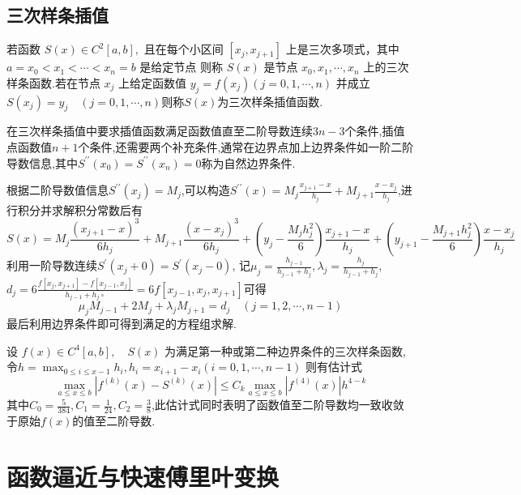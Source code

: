 \documentclass[10pt]{yerbaformat}
\begin{document}
\subsection{三次样条插值}
\begin{definition}
    若函数 $S(x) \in C^{2}[a, b],$ 且在每个小区间 $\left[x_{j}, x_{j+1}\right]$
    上是三次多项式，其中 $a=x_{0}<x_{1}<\cdots<x_{n}=b$ 是给定节点
    则称 $S(x)$ 是节点 $x_{0}, x_{1}, \cdots, x_{n}$ 上的三次样条函数.若在节点 $x_{j}$ 上给定函数值 $y_{j}=f\left(x_{j}\right)(j=0,1, \cdots, n)$
    并成立$S\left(x_{j}\right)=y_{j} \quad(j=0,1, \cdots, n)$则称$S(x)$为三次样条插值函数.
\end{definition}

\par 在三次样条插值中要求插值函数满足函数值直至二阶导数连续$3n-3$个条件,插值点函数值$n+1$个条件,还需要两个补充条件,通常在边界点加上边界条件如一阶二阶导数信息,其中$S^{\prime \prime}\left(x_{0}\right)=S^{\prime \prime}\left(x_{n}\right)=0$称为自然边界条件.

\par 根据二阶导数值信息$S^{\prime \prime}\left(x_{j}\right)=M_{j}$,可以构造$S^{\prime \prime}(x)=M_{j} \frac{x_{j+1}-x}{h_{j}}+M_{j+1} \frac{x-x_{j}}{h_{j}}$,进行积分并求解积分常数后有$$S(x) =M_{j} \frac{\left(x_{j+1}-x\right)^{3}}{6 h_{j}}+M_{j+1} \frac{\left(x-x_{j}\right)^{3}}{6 h_{j}}
    +\left(y_{j}-\frac{M_{j} h_{j}^{2}}{6}\right) \frac{x_{j+1}-x}{h_{j}}+\left(y_{j+1}-\frac{M_{j+1} h_{j}^{2}}{6}\right) \frac{x-x_{j}}{h_{j}}$$利用一阶导数连续$S^{\prime}\left(x_{j}+0\right)=S^{\prime}\left(x_{j}-0\right)$,
记$\mu_{j}=\frac{h_{j-1}}{h_{j-1}+h_{j}}, \lambda_{j}=\frac{h_{j}}{h_{j-1}+h_{j}}$,$d_{j}=6 \frac{f\left[x_{j}, x_{j+1}\right]-f\left[x_{j-1}, x_{j}\right]}{h_{j-1}+h_{j} \circ}=6 f\left[x_{j-1}, x_{j}, x_{j+1}\right]$可得$$\mu_{j} M_{j-1}+2 M_{j}+\lambda_{j} M_{j+1}=d_{j} \quad(j=1,2, \cdots, n-1)$$最后利用边界条件即可得到满足的方程组求解.

\begin{theorem}
    设 $f(x) \in C^{4}[a, b], \quad S(x)$ 为满足第一种或第二种边界条件的三次样条函数,令$h=\max _{0 \leq i \leq x-1} h_{i}, h_{i}=x_{i+1}-x_{i}(i=0,1, \cdots, n-1)$
    则有估计式$$\max _{a \leq x \leq b}\left|f^{(k)}(x)-S^{(k)}(x)\right| \leq C_{k} \max _{a \leq x \leq b}\left|f^{(4)}(x)\right| h^{4-k}$$其中$C_{0}=\frac{5}{384}, C_{1}=\frac{1}{24}, C_{2}=\frac{3}{8}$,此估计式同时表明了函数值至二阶导数均一致收敛于原始$f(x)$的值至二阶导数.
\end{theorem}

\section{函数逼近与快速傅里叶变换}
\end{document}

